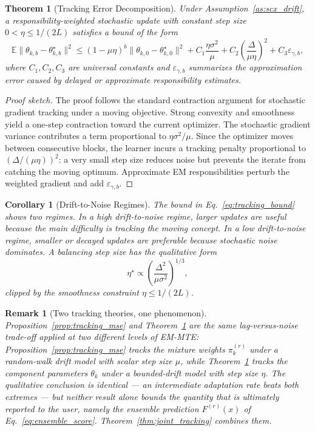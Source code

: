 ﻿\documentclass[12pt,a4paper]{article}
\newtheorem{theorem}{Theorem}
\newtheorem{corollary}{Corollary}
\newtheorem{remark}{Remark}
\newcommand{\E}{\mathbb{E}}
\begin{document}
\begin{theorem}[Tracking Error Decomposition]
\label{thm:tracking}
Under Assumption~\ref{as:scx_drift}, a responsibility-weighted stochastic
update with constant step size $0<\eta\leq1/(2L)$ satisfies a bound of the
form
\begin{equation}
\E\|\theta_{k,b}-\theta_{k,b}^{\star}\|^2
\leq
(1-\mu\eta)^b\|\theta_{k,0}-\theta_{k,0}^{\star}\|^2
+ C_1\frac{\eta\sigma^2}{\mu}
+ C_2\left(\frac{\Delta}{\mu\eta}\right)^2
+ C_3\varepsilon_{\gamma,b},
\label{eq:tracking_bound}
\end{equation}
where $C_1,C_2,C_3$ are universal constants and $\varepsilon_{\gamma,b}$
summarizes the approximation error caused by delayed or approximate
responsibility estimates.
\end{theorem}
\begin{proof}[Proof sketch]
The proof follows the standard contraction argument for stochastic gradient
tracking under a moving objective. Strong convexity and smoothness yield a
one-step contraction toward the current optimizer. The stochastic gradient
variance contributes a term proportional to $\eta\sigma^2/\mu$. Since the
optimizer moves between consecutive blocks, the learner incurs a tracking
penalty proportional to $(\Delta/(\mu\eta))^2$: a very small step size
reduces noise but prevents the iterate from catching the moving optimum.
Approximate EM responsibilities perturb the weighted gradient and add
$\varepsilon_{\gamma,b}$.
\end{proof}

\begin{corollary}[Drift-to-Noise Regimes]
\label{cor:drift_noise_regimes}
The bound in Eq.~\eqref{eq:tracking_bound} shows two regimes. In a high
drift-to-noise regime, larger updates are useful because the main
difficulty is tracking the moving concept. In a low drift-to-noise regime,
smaller or decayed updates are preferable because stochastic noise
dominates. A balancing step size has the qualitative form
\begin{equation}
\eta^{\star}\propto
\left(\frac{\Delta^2}{\mu\sigma^2}\right)^{1/3},
\end{equation}
clipped by the smoothness constraint $\eta\leq1/(2L)$.
\end{corollary}

\begin{remark}[Two tracking theories, one phenomenon]
\label{rem:two_theories}
Proposition~\ref{prop:tracking_mse} and Theorem~\ref{thm:tracking} are the
same lag-versus-noise trade-off applied at two different levels of
EM-MTE: Proposition~\ref{prop:tracking_mse} tracks the \emph{mixture
weights} $\pi_k^{(r)}$ under a random-walk drift model with scalar step size
$\mu$, while Theorem~\ref{thm:tracking} tracks the \emph{component
parameters} $\theta_k$ under a bounded-drift model with step size $\eta$.
The qualitative conclusion is identical — an intermediate adaptation rate
beats both extremes — but neither result alone bounds the quantity that is
ultimately reported to the user, namely the ensemble prediction
$F^{(r)}(x)$ of Eq.~\eqref{eq:ensemble_score}. Theorem~\ref{thm:joint_tracking}
combines them.
\end{remark}
\end{document}
